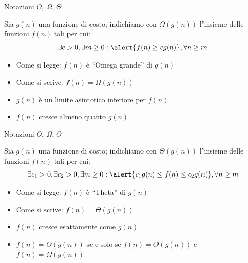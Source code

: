 \begin{frame}{Notazioni $O$, $\Omega$, $\Theta$}

\vspace{-9pt}
\begin{myboxtitle}
Sia $g(n)$ una funzione di costo; indichiamo con $\Omega(g(n))$ l'insieme
delle funzioni $f(n)$ tali per cui:\\[-6pt]
\[
  \exists c>0, \exists m \geq 0: \alert{f(n) \geq cg(n)}, \forall n \geq m
\]
\end{myboxtitle}

\medskip
\begin{itemize}
\item Come si legge: $f(n)$ è “\alert{Omega grande}”  di $g(n)$
\item Come si scrive: $f(n) = \Omega(g(n))$
\item $g(n)$ è un \alert{limite asintotico inferiore} per $f(n)$
\item $f(n)$ cresce almeno quanto $g(n)$
\end{itemize}
\end{frame}

\begin{frame}{Notazioni $O$, $\Omega$, $\Theta$}

\vspace{-9pt}
\begin{myboxtitle}
Sia $g(n)$ una funzione di costo; indichiamo con $\Theta(g(n))$ l'insieme
delle funzioni $f(n)$ tali per cui:\\[-6pt]
\[
  \exists c_1>0, \exists c_2>0, \exists m \geq 0: \alert{c_1g(n) \leq f(n) \leq c_2g(n)}, \forall n \geq m
\]
\end{myboxtitle}

\medskip
\begin{itemize}
\item Come si legge: $f(n)$ è “\alert{Theta}” di $g(n)$
\item Come si scrive: $f(n) = \Theta(g(n))$
\item $f(n)$ cresce esattamente come $g(n)$
\item $f(n) = \Theta(g(n))$ se e solo se $f(n) = O(g(n))$ e $f(n) = \Omega(g(n))$
\end{itemize}

\end{frame}

